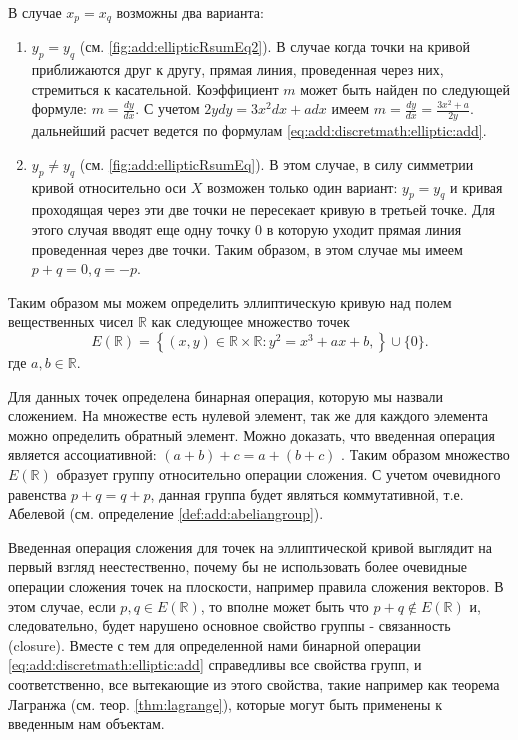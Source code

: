 В случае $x_p = x_q$ возможны два варианта:
\begin{enumerate}
\item $y_p = y_q$ (см. \autoref{fig:add:ellipticRsumEq2}). В случае
  когда точки на кривой приближаются друг к другу, прямая линия,
  проведенная через них, стремиться к касательной. Коэффициент $m$
  может быть найден по следующей формуле: $m = \frac{dy}{dx}$. С
  учетом $2ydy = 3x^2 dx + a dx$ имеем $m = \frac{dy}{dx} = \frac{3
    x^2 + a}{2y}$. дальнейший расчет ведется по формулам
  \eqref{eq:add:discretmath:elliptic:add}. 
\item $y_p \ne y_q$ (см. \autoref{fig:add:ellipticRsumEq}). В этом
  случае, в силу симметрии кривой относительно оси $X$ возможен только
  один вариант: $y_p = y_q$ и кривая проходящая через эти две точки не
  пересекает кривую в третьей точке. Для этого случая вводят еще одну
  точку $0$ в которую уходит прямая линия проведенная через две точки.
  Таким образом, в этом случае мы имеем $p + q = 0, q = -p$.
\end{enumerate}

Таким образом мы можем определить эллиптическую кривую над полем
вещественных чисел $\mathbb{R}$
как следующее множество точек
\begin{equation}
E\left(\mathbb{R}\right) = \left\{ (x,y) \in \mathbb{R} \times \mathbb{R}:
y^2 = x^3 +ax +b, 
\right\} \cup \{0\}.
\label{eq:add:discretmath:elliptic:er}
\end{equation}
где $a,b \in \mathbb{R}$.

Для данных точек определена бинарная операция, которую мы назвали
сложением. На множестве есть нулевой элемент, так же для каждого
элемента можно определить обратный элемент. Можно доказать, что
введенная операция является ассоциативной: $(a+b) + c = a + (b+c)$
\cite{Washington:2008:ECN:1388394}. Таким образом множество
$E\left(\mathbb{R}\right)$ образует группу относительно операции
сложения. С учетом очевидного равенства $p + q = q + p$, данная группа
будет являться коммутативной, т.е. Абелевой (см. определение
\ref{def:add:abeliangroup}).   

\begin{remark}
Введенная операция сложения для точек на эллиптической кривой выглядит
на первый взгляд неестественно, почему бы не использовать более
очевидные операции сложения точек на плоскости, например правила
сложения векторов. В этом случае, если $p,q \in
E\left(\mathbb{R}\right)$, то вполне может быть что $p + q \not\in
E\left(\mathbb{R}\right)$ и, следовательно, будет нарушено основное
свойство группы - связанность (closure). Вместе с тем для определенной
нами бинарной операции \eqref{eq:add:discretmath:elliptic:add}
справедливы все свойства групп, и соответственно, все вытекающие из
этого свойства, такие например как теорема Лагранжа (см. теор.
\ref{thm:lagrange}),  которые могут 
быть применены к введенным нам объектам.
\end{remark}


